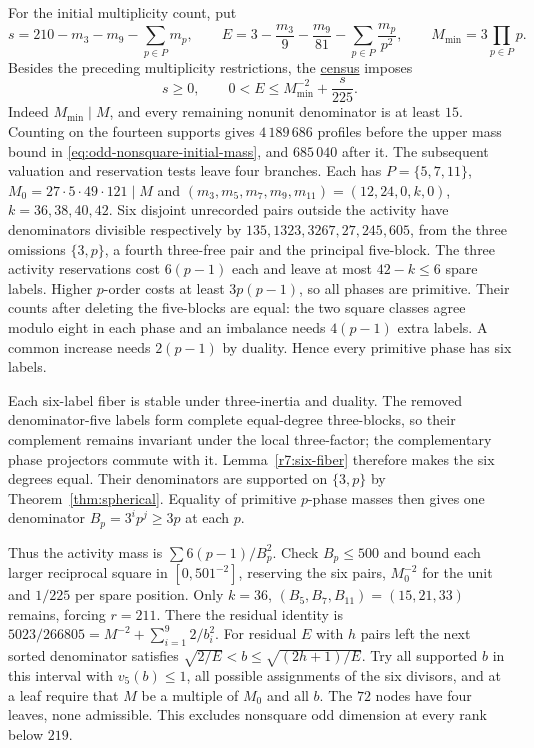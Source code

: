 \documentclass[11pt]{amsart}
\numberwithin{equation}{section}
\theoremstyle{definition}
\theoremstyle{plain}
\newcommand{\supfile}[2]{\href{run:rank-bound-supplement/#1}{#2}}
\begin{document}
For the initial multiplicity count, put
\[
 s=210-m_3-m_9-\sum_{p\in P}m_p,\qquad
 E=3-\frac{m_3}{9}-\frac{m_9}{81}-\sum_{p\in P}\frac{m_p}{p^2},
 \qquad M_{\min}=3\prod_{p\in P}p .
\]
Besides the preceding multiplicity restrictions, the
\supfile{odd_nonsquare/receipt.json}{census} imposes
\begin{equation}\label{eq:odd-nonsquare-initial-mass}
 s\ge0,\qquad 0<E\le M_{\min}^{-2}+\frac{s}{225}.
\end{equation}
Indeed $M_{\min}\mid M$, and every remaining nonunit denominator
is at least $15$. Counting on the fourteen supports gives
$4\,189\,686$ profiles before the upper mass bound in
\eqref{eq:odd-nonsquare-initial-mass}, and $685\,040$ after it.
The subsequent valuation and reservation tests leave four branches.
Each has $P=\{5,7,11\}$, $M_0=27\cdot5\cdot49\cdot121\mid M$ and
$(m_3,m_5,m_7,m_9,m_{11})=(12,24,0,k,0)$, $k=36,38,40,42$.
Six disjoint unrecorded pairs outside the activity have denominators
divisible respectively by $135,1323,3267,27,245,605$, from the three
omissions $\{3,p\}$, a fourth three-free pair and the principal five-block.
The three activity reservations cost $6(p-1)$ each and leave at most
$42-k\le6$ spare labels. Higher $p$-order costs at least $3p(p-1)$, so
all phases are primitive. Their counts after deleting the five-blocks
are equal: the two square classes agree modulo eight in each phase
and an imbalance needs $4(p-1)$ extra labels. A common increase needs
$2(p-1)$ by duality. Hence every primitive phase has six labels.

Each six-label fiber is stable under three-inertia and duality.
The removed denominator-five labels form complete equal-degree
three-blocks, so their complement remains invariant under the local
three-factor; the complementary phase projectors commute with it.
Lemma~\ref{r7:six-fiber} therefore makes the six degrees equal.
Their denominators are supported on $\{3,p\}$ by
Theorem~\ref{thm:spherical}. Equality of primitive $p$-phase masses
then gives one denominator $B_p=3^i p^j\ge3p$ at each $p$.

Thus the activity mass is $\sum 6(p-1)/B_p^2$. Check $B_p\le500$ and
bound each larger reciprocal square in $[0,501^{-2}]$, reserving the
six pairs, $M_0^{-2}$ for the unit and $1/225$ per spare position.
Only $k=36$, $(B_5,B_7,B_{11})=(15,21,33)$ remains, forcing $r=211$.
There the residual identity is
$5023/266805=M^{-2}+\sum_{i=1}^{9}2/b_i^2$. For residual $E$ with
$h$ pairs left the next sorted denominator satisfies
$\sqrt{2/E}<b\le\sqrt{(2h+1)/E}$. Try all supported $b$ in this interval
with $v_5(b)\le1$, all possible assignments of the six divisors, and at
a leaf require that $M$ be a multiple of $M_0$ and all $b$.
The $72$ nodes have four leaves, none admissible. This excludes nonsquare odd dimension at every rank below $219$.
\end{document}
